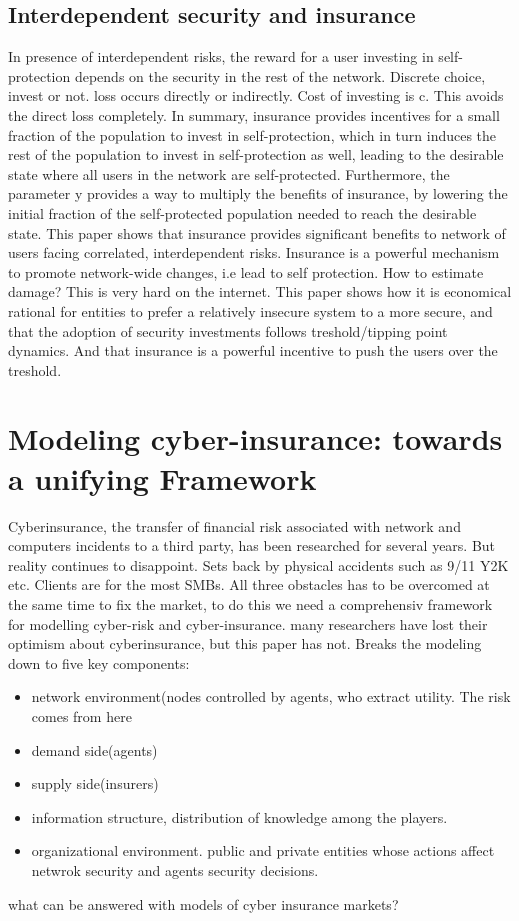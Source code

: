 \subsection{Interdependent security and insurance}
In presence of interdependent risks, the reward for a user investing in self-protection depends on the security in the rest of the network.
Discrete choice, invest or not. loss occurs directly or indirectly. Cost of investing is c. This avoids the direct loss completely. 
In summary, insurance provides incentives for a
small fraction of the population to invest in self-protection, which in turn induces the rest
of the population to invest in self-protection as well, leading to the desirable state where
all users in the network are self-protected. Furthermore, the parameter y provides a way
to multiply the beneﬁts of insurance, by lowering the initial fraction of the self-protected
population needed to reach the desirable state.
This paper shows that insurance provides significant benefits to network of users facing correlated, interdependent risks. Insurance is a powerful mechanism to promote network-wide changes, i.e lead to self protection.
How to estimate damage? This is very hard on the internet. 
This paper shows how it is economical rational for entities to prefer a relatively insecure system to a more secure, and that the adoption of security investments follows treshold/tipping point dynamics. And that insurance is a powerful incentive to push the users over the treshold.
\section{Modeling cyber-insurance: towards a unifying Framework}
Cyberinsurance, the transfer of financial risk associated with network and computers incidents to a third party, has been researched for several years. But reality continues to disappoint. Sets back by physical accidents such as 9/11 Y2K etc. Clients are for the most SMBs. 
All three obstacles has to be overcomed at the same time to fix the market, to do this we need a comprehensiv framework for modelling cyber-risk and cyber-insurance.
many researchers have lost their optimism about cyberinsurance, but this paper has not.
Breaks the modeling down to five key components: 
\begin{itemize}[topsep=-1em,parsep=0em,itemsep=0em] 
 \item network environment(nodes controlled by agents, who extract utility. The risk comes from here \item demand side(agents) \item supply side(insurers) \item information structure, distribution of knowledge among the players. \item organizational environment. public and private entities whose actions affect netwrok security and agents security decisions.
 
\end{itemize}
what can be answered with models of cyber insurance markets?

